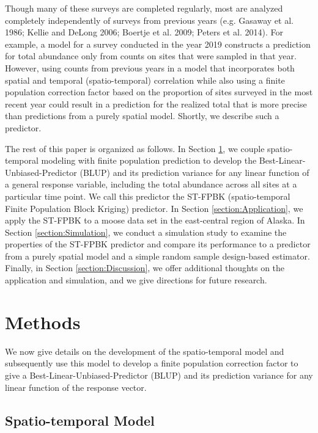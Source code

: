 \documentclass[]{article}    %
\begin{document}
Though many of these surveys are completed regularly, most are analyzed
completely independently of surveys from previous years (e.g. Gasaway et
al. 1986; Kellie and DeLong 2006; Boertje et al. 2009; Peters et al.
2014). For example, a model for a survey conducted in the year 2019
constructs a prediction for total abundance only from counts on sites
that were sampled in that year. However, using counts from previous
years in a model that incorporates both spatial and temporal
(spatio-temporal) correlation while also using a finite population
correction factor based on the proportion of sites surveyed in the most
recent year could result in a prediction for the realized total that is
more precise than predictions from a purely spatial model. Shortly, we
describe such a predictor.

The rest of this paper is organized as follows. In Section
\ref{section:Methods}, we couple spatio-temporal modeling with finite
population prediction to develop the Best-Linear-Unbiased-Predictor
(BLUP) and its prediction variance for any linear function of a general
response variable, including the total abundance across all sites at a
particular time point. We call this predictor the ST-FPBK
(spatio-temporal Finite Population Block Kriging) predictor. In Section
\ref{section:Application}, we apply the ST-FPBK to a moose data set in
the east-central region of Alaska. In Section \ref{section:Simulation},
we conduct a simulation study to examine the properties of the ST-FPBK
predictor and compare its performance to a predictor from a purely
spatial model and a simple random sample design-based estimator.
Finally, in Section \ref{section:Discussion}, we offer additional
thoughts on the application and simulation, and we give directions for
future research.

\hypertarget{section:Methods}{%
\section{Methods}\label{section:Methods}}

We now give details on the development of the spatio-temporal model and
subsequently use this model to develop a finite population correction
factor to give a Best-Linear-Unbiased-Predictor (BLUP) and its
prediction variance for any linear function of the response vector.

\hypertarget{spatio-temporal-model}{%
\subsection{Spatio-temporal Model}\label{spatio-temporal-model}}
\end{document}
